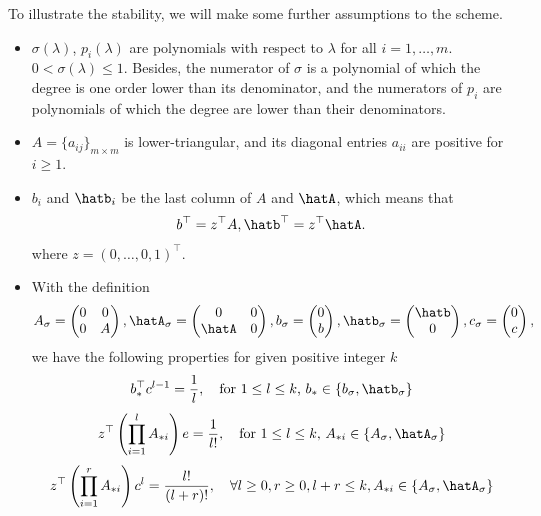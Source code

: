 
To illustrate the stability, we will make some further assumptions
to the scheme.
\begin{itemize}
    \item[{\bf (P1)}] $\sigma(\lambda)$, $p_i(\lambda)$ are polynomials with respect to $\lambda$ for all $i=1, \dots, m$.
    $0 < \sigma(\lambda) \leq 1$.
    Besides, the numerator of $\sigma$ is a polynomial of which the degree is one order lower than its denominator,
    and the numerators of $p_i$ are polynomials of which the degree are lower than their denominators.
    \item[{\bf (P2)}] $A = \{a_{ij}\}_{m\times m}$ is lower-triangular, and its diagonal entries $a_{ii}$ are positive for $i\geq 1$.
    \item[{\bf (P3)}] $b_i$ and $\hatb_i$ be the last column of $A$ and $\hatA$, which means that
    \begin{equation}\label{eq:LastRow}
        b^\top = z^\top A, \hatb^\top =  z^\top \hatA.
    \end{equation}
    where $z = (0, \dots, 0, 1)^\top$.
    \item[{\bf (P4)}] With the definition
    $$A_\sigma = \begin{pmatrix}0 & 0 \\ 0 & A \end{pmatrix}, \hatA_\sigma = \begin{pmatrix}0 & 0 \\ \hatA & 0 \end{pmatrix}, b_\sigma =\begin{pmatrix}0 \\ b\end{pmatrix},\hatb_\sigma =\begin{pmatrix}\hatb\\0\end{pmatrix},
    c_\sigma = \begin{pmatrix}0 \\c\end{pmatrix},$$
    we have the following properties for given positive integer $k$
    $${b}_*^\top c^{l-1} = \frac{1}{l}, \text{\quad for $1\leq l \leq k$, ${b}_* \in\{b_\sigma, \hatb_\sigma\}$}$$
    $$z^\top \left(\prod_{i=1}^{l}A_{*i}\right) e = \frac{1}{l!}, \text{\quad for $1\leq l \leq k$, $A_{*i} \in\{A_\sigma, \hatA_\sigma\}$}$$
    \begin{equation*}
        z^\top\left(\prod_{i=1}^{r}A_{*i}\right) c^l = \frac{l!}{(l+r)!}, \quad \forall l\geq 0, r\geq 0, l+r\leq k, A_{*i} \in\{A_\sigma, \hatA_\sigma\}
    \end{equation*}
\end{itemize}

